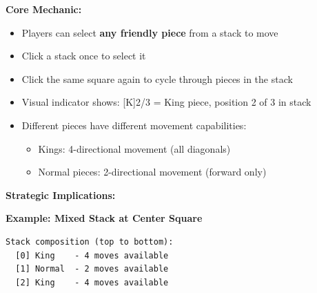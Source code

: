 \documentclass[12pt,a4paper]{article}
\begin{document}
\textbf{Core Mechanic:}
\begin{itemize}
    \item Players can select \textbf{any friendly piece} from a stack to move
    \item Click a stack once to select it
    \item Click the same square again to cycle through pieces in the stack
    \item Visual indicator shows: [K]2/3 = King piece, position 2 of 3 in stack
    \item Different pieces have different movement capabilities:
    \begin{itemize}
        \item Kings: 4-directional movement (all diagonals)
        \item Normal pieces: 2-directional movement (forward only)
    \end{itemize}
\end{itemize}

\textbf{Strategic Implications:}

\textbf{Example: Mixed Stack at Center Square}
\begin{verbatim}
Stack composition (top to bottom):
  [0] King    - 4 moves available
  [1] Normal  - 2 moves available  
  [2] King    - 4 moves available
\end{verbatim}
\end{document}
